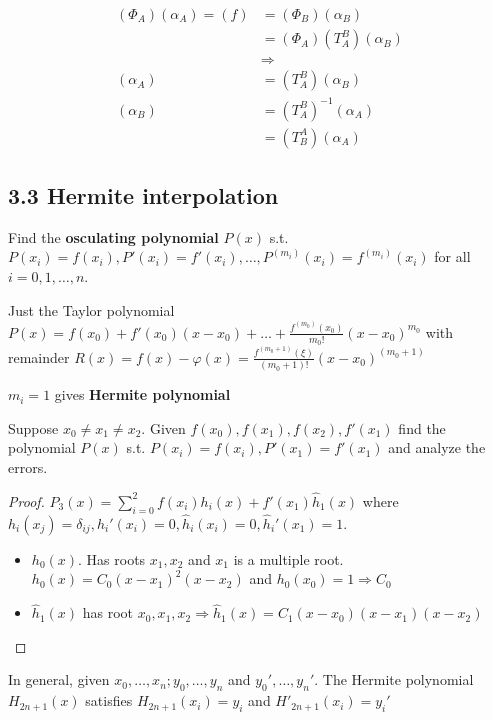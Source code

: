 \documentclass[11pt]{article}
\begin{document}
    \begin{align*}
      (\Phi_A)(\alpha_A)=(f)&=(\Phi_B)(\alpha_B)\\
                            &=(\Phi_A)(T_A^B)(\alpha_B)\\
                            &\Rightarrow\\
      (\alpha_A)&=(T_A^B)(\alpha_B)\\
      (\alpha_B)&=(T_A^B)^{-1}(\alpha_A)\\
                            &=(T_B^A)(\alpha_A)
    \end{align*}
    \subsection{3.3 Hermite interpolation}
    \label{sec:org5ca591b}
    Find the \textbf{osculating polynomial} \(P(x)\) s.t. \(P(x_i)=f(x_i),
    P'(x_i)=f'(x_i),\dots,P^{(m_i)}(x_i)=f^{(m_i)}(x_i)\) for all \(i=0,1,\dots,n\).

    Just the Taylor polynomial \(P(x)=f(x_0)+f'(x_0)(x-x_0)+\dots+
    \frac{f^{(m_0)}(x_0)}{m_0!}(x-x_0)^{m_0}\) with remainder 
    \(R(x)=f(x)-\varphi(x)=\frac{f^{(m_0+1)}(\xi)}{(m_0+1)!}(x-x_0)^{(m_0+1)}\)

    \(m_i = 1\) gives \textbf{Hermite polynomial}

    \begin{example}
      Suppose $x_0\neq x_1\neq x_2$. Given $f(x_0),f(x_1), f(x_2),
      f'(x_1)$ find the polynomial $P(x)$ s.t. $P(x_i)=f(x_i),P'(x_1)=f'(x_1)$ and
      analyze the errors.
    \end{example}

    \begin{proof}
      $P_3(x)=\displaystyle\sum_{i=0}^2f(x_i)h_i(x)+f'(x_1)\hat{h}_1(x)$ where
      $h_i(x_j)=\delta_{ij},h_i'(x_i)=0,\hat{h}_i(x_i)=0,\hat{h}_i'(x_1)=1$.
      \begin{itemize}
      \item $h_0(x)$. Has roots $x_1,x_2$ and $x_1$ is a multiple root.
        $h_0(x)=C_0(x-x_1)^2(x-x_2)$ and $h_0(x_0)=1\Longrightarrow C_0$
      \item $\hat{h}_1(x)$ has root $x_0,x_1,x_2\Longrightarrow 
        \hat{h}_1(x)=C_1(x-x_0)(x-x_1)(x-x_2)$
      \end{itemize}
    \end{proof}

    In general, given \(x_0,\dots,x_n;y_0,\dots,y_n\) and \(y_0',\dots,y_n'\). The
    Hermite polynomial \(H_{2n+1}(x)\) satisfies \(H_{2n+1}(x_i)=y_i\) and
    \(H'_{2n+1}(x_i)=y_i'\) 
\end{document}
